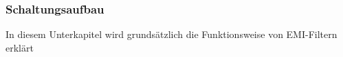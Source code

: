 \subsubsection{Schaltungsaufbau} \label{subsec:schaltungsaufbau}
In diesem Unterkapitel wird grundsätzlich die Funktionsweise von EMI-Filtern erklärt